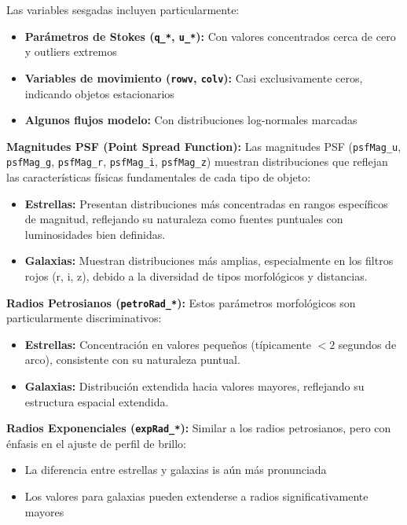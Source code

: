\documentclass{article}
\begin{document}
Las variables sesgadas incluyen particularmente:
\begin{itemize}
    \item \textbf{Parámetros de Stokes (\texttt{q\_*}, \texttt{u\_*}):} Con valores concentrados cerca de cero y outliers extremos
    \item \textbf{Variables de movimiento (\texttt{rowv}, \texttt{colv}):} Casi exclusivamente ceros, indicando objetos estacionarios
    \item \textbf{Algunos flujos modelo:} Con distribuciones log-normales marcadas
\end{itemize}

\textbf{Magnitudes PSF (Point Spread Function):}
Las magnitudes PSF (\texttt{psfMag\_u}, \texttt{psfMag\_g}, \texttt{psfMag\_r}, \texttt{psfMag\_i}, \texttt{psfMag\_z}) muestran distribuciones que reflejan las características físicas fundamentales de cada tipo de objeto:

\begin{itemize}
    \item \textbf{Estrellas:} Presentan distribuciones más concentradas en rangos específicos de magnitud, reflejando su naturaleza como fuentes puntuales con luminosidades bien definidas.
    \item \textbf{Galaxias:} Muestran distribuciones más amplias, especialmente en los filtros rojos (r, i, z), debido a la diversidad de tipos morfológicos y distancias.
\end{itemize}

\textbf{Radios Petrosianos (\texttt{petroRad\_*}):}
Estos parámetros morfológicos son particularmente discriminativos:

\begin{itemize}
    \item \textbf{Estrellas:} Concentración en valores pequeños (típicamente $< 2$ segundos de arco), consistente con su naturaleza puntual.
    \item \textbf{Galaxias:} Distribución extendida hacia valores mayores, reflejando su estructura espacial extendida.
\end{itemize}

\textbf{Radios Exponenciales (\texttt{expRad\_*}):}
Similar a los radios petrosianos, pero con énfasis en el ajuste de perfil de brillo:

\begin{itemize}
    \item La diferencia entre estrellas y galaxias is aún más pronunciada
    \item Los valores para galaxias pueden extenderse a radios significativamente mayores
\end{itemize}
\end{document}
